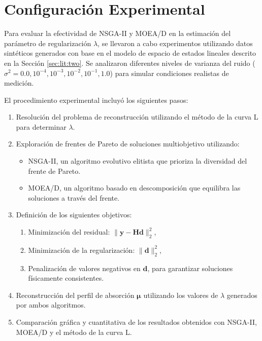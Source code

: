 
\section{Configuración Experimental} \label{sec:results:setup}

Para evaluar la efectividad de NSGA-II y MOEA/D en la estimación del parámetro de regularización \( \lambda \), se llevaron a cabo experimentos utilizando datos sintéticos generados con base en el modelo de espacio de estados lineales descrito en la Sección \ref{sec:lit:two}. Se analizaron diferentes niveles de varianza del ruido (\( \sigma^2 = 0.0, 10^{-4}, 10^{-3}, 10^{-2}, 10^{-1}, 1.0 \)) para simular condiciones realistas de medición.

El procedimiento experimental incluyó los siguientes pasos:
\begin{enumerate}
    \item Resolución del problema de reconstrucción utilizando el método de la curva L para determinar \( \lambda \).
    \item Exploración de frentes de Pareto de soluciones multiobjetivo utilizando:
    \begin{itemize}
        \item NSGA-II, un algoritmo evolutivo elitista que prioriza la diversidad del frente de Pareto.
        \item MOEA/D, un algoritmo basado en descomposición que equilibra las soluciones a través del frente.
    \end{itemize}
    \item Definición de los siguientes objetivos:
    \begin{enumerate}
        \item Minimización del residual: \( \| \mathbf{y} - \mathbf{H} \mathbf{d} \|_2^2 \),
        \item Minimización de la regularización: \( \| \mathbf{d} \|_2^2 \),
        \item Penalización de valores negativos en \( \mathbf{d} \), para garantizar soluciones físicamente consistentes.
    \end{enumerate}
    \item Reconstrucción del perfil de absorción \( \mathbf{\mu} \) utilizando los valores de \( \lambda \) generados por ambos algoritmos.
    \item Comparación gráfica y cuantitativa de los resultados obtenidos con NSGA-II, MOEA/D y el método de la curva L.
\end{enumerate}

